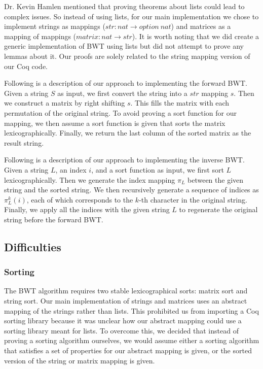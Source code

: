 \documentclass[11pt,letterpaper,]{article}
\begin{document}
Dr. Kevin Hamlen mentioned that proving theorems about lists could lead to
complex issues. So instead of using lists, for our main implementation we chose
to implement strings as mappings ($str: nat \rightarrow option\ nat$) and
matrices as a mapping of mappings ($matrix: nat \rightarrow str$). It is worth
noting that we did create a generic implementation of BWT using lists but did
not attempt to prove any lemmas about it. Our proofs are solely related to the
string mapping version of our Coq code.

Following is a description of our approach to implementing the forward BWT.
Given a string $S$ as input, we first convert the string into a $str$ mapping
$s$. Then we construct a matrix by right shifting $s$. This fills the matrix
with each permutation of the original string. To avoid proving a sort function
for our mapping, we then assume a sort function is given that sorts the matrix
lexicographically. Finally, we return the last column of the sorted matrix as
the result string.

Following is a description of our approach to implementing the inverse BWT.
Given a string $L$, an index $i$, and a sort function as input, we first sort
$L$ lexicographically. Then we generate the index mapping $\pi_L$ between the
given string and the sorted string. We then recursively generate a sequence of
indices as $\pi_L^k(i)$, each of which corresponds to the $k$-th character in
the original string. Finally, we apply all the indices with the given string
$L$ to regenerate the original string before the forward BWT.

\subsection{Difficulties}

\subsubsection{Sorting}

The BWT algorithm requires two stable lexicographical sorts: matrix sort and
string sort. Our main implementation of strings and matrices uses an abstract
mapping of the strings rather than lists. This prohibited us from importing a
Coq sorting library because it was unclear how our abstract mapping could use a
sorting library meant for lists. To overcome this, we decided that instead of
proving a sorting algorithm ourselves, we would assume either a sorting
algorithm that satisfies a set of properties for our abstract mapping is given,
or the sorted version of the string or matrix mapping is given.
\end{document}
